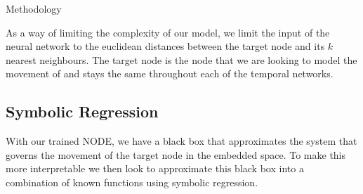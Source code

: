\documentclass[12pt]{amsart}
\begin{document}
\begin{section}{Methodology}
        
        As a way of limiting the complexity of our model, we limit the input of the neural network to the euclidean distances between the target node and its $k$ nearest neighbours. The target node is the node that we are looking to model the movement of and stays the same throughout each of the temporal networks. 

    \subsection{Symbolic Regression}
        With our trained NODE, we have a black box that approximates the system that governs the movement of the target node in the embedded space. To make this more interpretable we then look to approximate this black box into a combination of known functions using symbolic regression\cite{pysr}.
        

\end{section}
\end{document}
